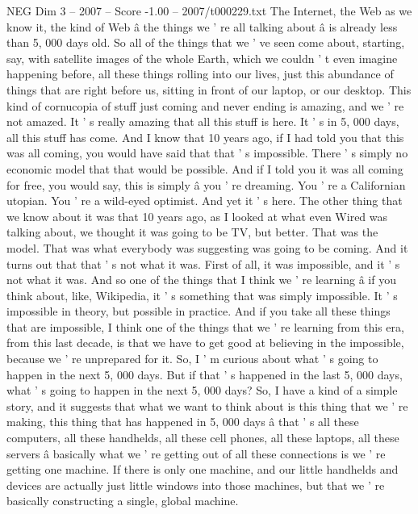 \begin{textsample}{NEG Dim 3 – 2007 – Score -1.00 – 2007/t000229.txt}  \label{ex:f3_neg_041}
The Internet, the Web as we know it, the kind of Web â the things we ' re all talking about â is already less than 5, 000 days old.
So all of the things that we ' ve seen come about, starting, say, with satellite images of the whole Earth, which we couldn ' t even imagine happening before, all these things rolling into our lives, just this abundance of things that are right before us, sitting in front of our laptop, or our desktop.
This kind of cornucopia of stuff just coming and never ending is amazing, and we ' re not amazed.
It ' s really amazing that all this stuff is here.
It ' s in 5, 000 days, all this stuff has come.
And I know that 10 years ago, if I had told you that this was all coming, you would have said that that ' s impossible.
There ' s simply no economic model that that would be possible.
And if I told you it was all coming for free, you would say, this is simply â you ' re dreaming.
You ' re a Californian utopian.
You ' re a wild-eyed optimist.
And yet it ' s here.
The other thing that we know about it was that 10 years ago, as I looked at what even Wired was talking about, we thought it was going to be TV, but better.
That was the model.
That was what everybody was suggesting was going to be coming.
And it turns out that that ' s not what it was.
First of all, it was impossible, and it ' s not what it was.
And so one of the things that I think we ' re learning â if you think about, like, Wikipedia, it ' s something that was simply impossible.
It ' s impossible in theory, but possible in practice.
And if you take all these things that are impossible, I think one of the things that we ' re learning from this era, from this last decade, is that we have to get good at believing in the impossible, because we ' re unprepared for it.
So, I ' m curious about what ' s going to happen in the next 5, 000 days.
But if that ' s happened in the last 5, 000 days, what ' s going to happen in the next 5, 000 days?
So, I have a kind of a simple story, and it suggests that what we want to think about is this thing that we ' re making, this thing that has happened in 5, 000 days â that ' s all these computers, all these handhelds, all these cell phones, all these laptops, all these servers â basically what we ' re getting out of all these connections is we ' re getting one machine.
If there is only one machine, and our little handhelds and devices are actually just little windows into those machines, but that we ' re basically constructing a single, global machine.

\end{textsample}
